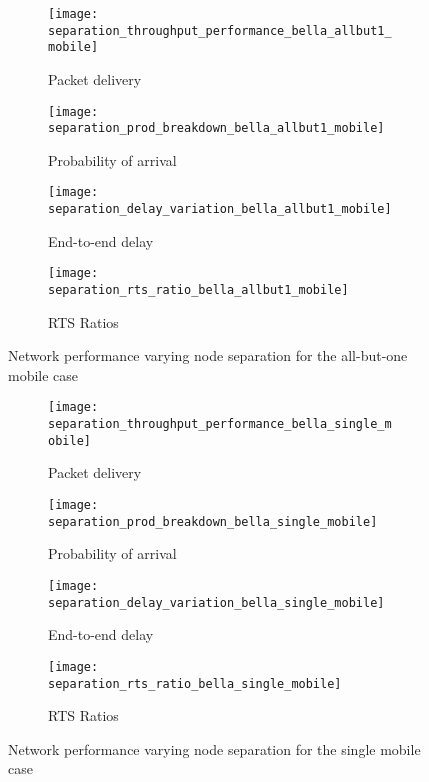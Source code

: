 \begin{figure}[tp!]
	\begin{subfigure}[t]{0.5\textwidth}
		\centering
		\texttt{[image: separation\_throughput\_performance\_bella\_allbut1\_mobile]}
		\caption{Packet delivery}
		\label{fig:separation_throughput_performance_bella_allbut1_mobile}
	\end{subfigure}
	\begin{subfigure}[t]{0.5\textwidth}
		\centering
		\texttt{[image: separation\_prod\_breakdown\_bella\_allbut1\_mobile]}
		\caption{Probability of arrival}
		\label{fig:separation_prod_breakdown_bella_allbut1_mobile}
	\end{subfigure}
	
	\begin{subfigure}[t]{0.5\textwidth}
		\centering
		\texttt{[image: separation\_delay\_variation\_bella\_allbut1\_mobile]}
		\caption{End-to-end delay}
		\label{fig:separation_delay_variation_bella_allbut1_mobile}
	\end{subfigure}
	\begin{subfigure}[t]{0.5\textwidth}
		\centering
		\texttt{[image: separation\_rts\_ratio\_bella\_allbut1\_mobile]}
		\caption{RTS Ratios}
		\label{fig:separation_rts_ratio_bella_allbut1_mobile}
	\end{subfigure}
	\caption{Network performance varying node separation for the all-but-one mobile case}
	\label{fig:separation_bella_allbut1_mobile}
\end{figure}

\begin{figure}[bp!]
	\begin{subfigure}[t]{0.5\textwidth}
		\centering
		\texttt{[image: separation\_throughput\_performance\_bella\_single\_mobile]}
		\caption{Packet delivery}
		\label{fig:separation_throughput_performance_bella_single_mobile}
	\end{subfigure}
	\begin{subfigure}[t]{0.5\textwidth}
		\centering
		\texttt{[image: separation\_prod\_breakdown\_bella\_single\_mobile]}
		\caption{Probability of arrival}
		\label{fig:separation_prod_breakdown_bella_single_mobile}
	\end{subfigure}
	
	\begin{subfigure}[t]{0.5\textwidth}
		\centering
		\texttt{[image: separation\_delay\_variation\_bella\_single\_mobile]}
		\caption{End-to-end delay}
		\label{fig:separation_delay_variation_bella_single_mobile}
	\end{subfigure}
	\begin{subfigure}[t]{0.5\textwidth}
		\centering
		\texttt{[image: separation\_rts\_ratio\_bella\_single\_mobile]}
		\caption{RTS Ratios}
		\label{fig:separation_rts_ratio_bella_single_mobile}
	\end{subfigure}
	\caption{Network performance varying node separation for the single mobile case}
	\label{fig:separation_bella_single_mobile}
\end{figure}


